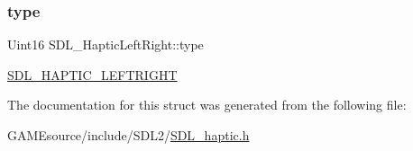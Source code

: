 \subsubsection{\texorpdfstring{type}{type}}
{\footnotesize\ttfamily Uint16 S\+D\+L\+\_\+\+Haptic\+Left\+Right\+::type}

\mbox{\hyperlink{_s_d_l__haptic_8h_ae047624d8458ff6400887c37a36f86d3}{S\+D\+L\+\_\+\+H\+A\+P\+T\+I\+C\+\_\+\+L\+E\+F\+T\+R\+I\+G\+HT}} 

The documentation for this struct was generated from the following file\+:\begin{DoxyCompactItemize}
\item 
G\+A\+M\+Esource/include/\+S\+D\+L2/\mbox{\hyperlink{_s_d_l__haptic_8h}{S\+D\+L\+\_\+haptic.\+h}}\end{DoxyCompactItemize}
